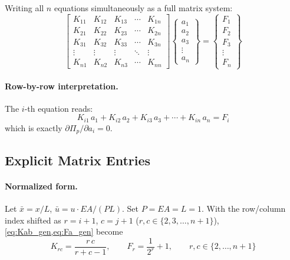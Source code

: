 \documentclass[11pt, a4paper]{article}
\begin{document}
Writing all $n$ equations simultaneously as a full matrix system:
\begin{equation}\label{eq:system_expanded}
\boxed{
\begin{bmatrix}
K_{11} & K_{12} & K_{13} & \cdots & K_{1n}\\[4pt]
K_{21} & K_{22} & K_{23} & \cdots & K_{2n}\\[4pt]
K_{31} & K_{32} & K_{33} & \cdots & K_{3n}\\[4pt]
\vdots & \vdots & \vdots & \ddots & \vdots\\[4pt]
K_{n1} & K_{n2} & K_{n3} & \cdots & K_{nn}
\end{bmatrix}
\begin{Bmatrix}
a_1 \\[4pt] a_2 \\[4pt] a_3 \\[4pt] \vdots \\[4pt] a_n
\end{Bmatrix}
=
\begin{Bmatrix}
F_1 \\[4pt] F_2 \\[4pt] F_3 \\[4pt] \vdots \\[4pt] F_n
\end{Bmatrix}
}
\end{equation}

\paragraph{Row-by-row interpretation.}
The $i$-th equation reads:
\[
K_{i1}\,a_1 + K_{i2}\,a_2 + K_{i3}\,a_3 + \cdots + K_{in}\,a_n = F_i
\]
which is exactly $\partial\Pi_p/\partial a_i = 0$.

\subsection{Explicit Matrix Entries}

\paragraph{Normalized form.}
Let $\bar{x}=x/L$, $\bar{u}=u\cdot EA/(PL)$.  Set $P=EA=L=1$.
With the row/column index shifted as $r=i+1$, $c=j+1$
($r,c\in\{2,3,\dots,n{+}1\}$),
\cref{eq:Kab_gen,eq:Fa_gen} become
\begin{equation}\label{eq:Kij_norm}
K_{rc}=\frac{r\,c}{r+c-1},\qquad
F_r=\frac{1}{2^r}+1,\qquad r,c\in\{2,\dots,n{+}1\}
\end{equation}
\end{document}
